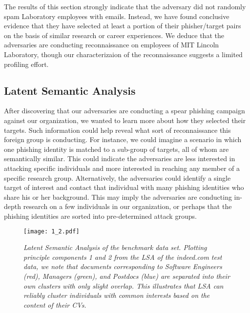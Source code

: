 \documentclass[conference]{IEEEtran}
\begin{document}
The results of this section strongly indicate that the adversary did not randomly spam Laboratory employees with emails.  Instead, we have found conclusive evidence that they have selected at least a portion 
of their phisher/target pairs on the basis of similar research or career experiences.  We deduce that the adversaries are conducting reconnaissance on employees of MIT Lincoln Laboratory, though our characterizaion of the reconnaissance suggests a limited profiling effort.

\subsection{Latent Semantic Analysis}
After discovering that our adversaries are conducting a spear phishing campaign against our organization, we wanted to learn more about how they selected their targets.  
Such information could help reveal what sort of reconnaissance this foreign group is conducting.  For instance, we could imagine a scenario in which one phishing identity is matched to a sub-group of targets, 
all of whom are semantically similar.  This could indicate the adversaries are less interested in attacking specific individuals and more interested in reaching any member of a specific research group.  
Alternatively, the adversaries could identify a single target of interest and contact that individual with many phishing identities who share his or her background.  This may imply the adversaries are conducting in-depth 
research on a few individuals in our organization, or perhaps that the phishing identities are sorted into pre-determined attack groups.
\begin{figure}[t!]
 \begin{center}
  \texttt{[image: 1\_2.pdf]}
  \caption{\sl Latent Semantic Analysis of the benchmark data set.  Plotting principle components 1 and 2 from the LSA of the indeed.com test data, we note that documents corresponding
  to Software Engineers (red), Managers (green), and Postdocs (blue) are separated into their own clusters with only slight overlap.  This illustrates that LSA can 
  reliably cluster individuals with common interests based on the content of their CVs. \label{fig:LSAdemo}}
 \end{center}
\end{figure}
\end{document}
